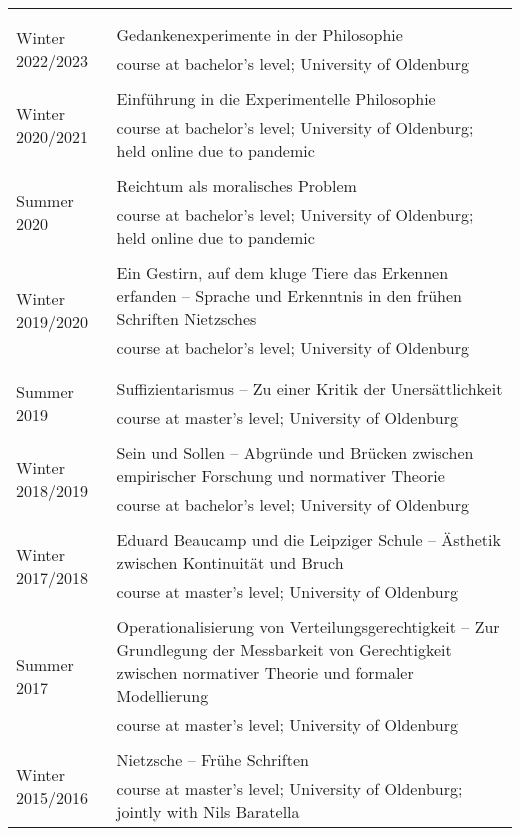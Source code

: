 \documentclass[a4paper,10pt]{article}
\begin{document}
\begin{longtable}{p{2.5cm}p{11cm}}
\\
\\
\\
\multirow{2}{2.5cm}{\footnotesize{Winter 2022/2023}} & Gedankenexperimente in der Philosophie\\
& \footnotesize{course at bachelor's level; University of Oldenburg}\\
\\
\multirow{2}{2.5cm}{\footnotesize{Winter 2020/2021}} & Einführung in die Experimentelle Philosophie\\
& \footnotesize{course at bachelor's level; University of Oldenburg; held online due to pandemic}\\
\\
\multirow{2}{2.5cm}{\footnotesize{Summer 2020}} & Reichtum als moralisches Problem\\
& \footnotesize{course at bachelor's level; University of Oldenburg; held online due to pandemic}\\
\\
\multirow{2}{2.5cm}{\footnotesize{Winter 2019/2020}} & Ein Gestirn, auf dem kluge Tiere das Erkennen erfanden -- Sprache und Erkenntnis in den frühen Schriften Nietzsches\\
& \footnotesize{course at bachelor's level; University of Oldenburg}\\
\\
\\ %
\multirow{2}{2.5cm}{\footnotesize{Summer 2019}} & Suffizientarismus -- Zu einer Kritik der Unersättlichkeit\\
& \footnotesize{course at master's level; University of Oldenburg}\\
\\
\multirow{2}{2.5cm}{\footnotesize{Winter 2018/2019}} & Sein und Sollen -- Abgründe und Brücken zwischen empirischer Forschung und normativer Theorie\\
& \footnotesize{course at bachelor's level; University of Oldenburg}\\
\\
\multirow{2}{2.5cm}{\footnotesize{Winter 2017/2018}} & Eduard Beaucamp und die Leipziger Schule -- Ästhetik zwischen Kontinuität und Bruch\\
& \footnotesize{course at master's level; University of Oldenburg}\\
\\
\multirow{2}{2.5cm}{\footnotesize{Summer 2017}} & Operationalisierung von Verteilungsgerechtigkeit -- Zur Grundlegung der Messbarkeit von Gerechtigkeit zwischen normativer Theorie und formaler Modellierung\\
& \footnotesize{course at master's level; University of Oldenburg}\\
\\
\multirow{2}{2.5cm}{\footnotesize{Winter 2015/2016}} & Nietzsche -- Frühe Schriften\\
& \footnotesize{course at master's level; University of Oldenburg; jointly with Nils Baratella}\\
\end{longtable}
\end{document}
